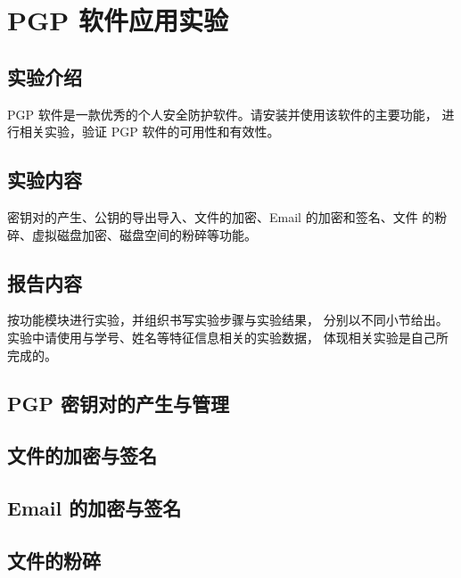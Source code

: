\documentclass[../main.tex]{subfiles}
\begin{document}
\chapter{PGP 软件应用实验}
\section{实验介绍}
PGP 软件是一款优秀的个人安全防护软件。请安装并使用该软件的主要功能，
进行相关实验，验证 PGP 软件的可用性和有效性。
%
\section{实验内容}
密钥对的产生、公钥的导出导入、文件的加密、Email 的加密和签名、文件
的粉碎、虚拟磁盘加密、磁盘空间的粉碎等功能。
%
\section{报告内容}
按功能模块进行实验，并组织书写实验步骤与实验结果，
分别以不同小节给出。实验中请使用与学号、姓名等特征信息相关的实验数据，
体现相关实验是自己所完成的。
\section{PGP 密钥对的产生与管理}

\section{文件的加密与签名}

\section{Email 的加密与签名}


\section{文件的粉碎}
\end{document}

